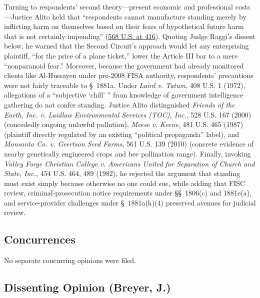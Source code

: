 \documentclass[12pt]{article}
\begin{document}
Turning to respondents' second theory---present economic and professional costs---Justice Alito held that ``respondents cannot manufacture standing merely by inflicting harm on themselves based on their fears of hypothetical future harm that is not certainly impending'' (\href{https://supreme.justia.com/cases/federal/us/568/398/}{568 U.S. at 416}). Quoting Judge Raggi's dissent below, he warned that the Second Circuit's approach would let any enterprising plaintiff, ``for the price of a plane ticket,'' lower the Article III bar to a mere ``nonparanoid fear.'' Moreover, because the government had already monitored clients like Al-Hussayen under pre-2008 FISA authority, respondents' precautions were not fairly traceable to \S~1881a. Under \textit{Laird v. Tatum}, 408 U.S. 1 (1972), allegations of a ``subjective `chill' '' from knowledge of government intelligence gathering do not confer standing. Justice Alito distinguished \textit{Friends of the Earth, Inc. v. Laidlaw Environmental Services (TOC), Inc.}, 528 U.S. 167 (2000) (concededly ongoing unlawful pollution), \textit{Meese v. Keene}, 481 U.S. 465 (1987) (plaintiff directly regulated by an existing ``political propaganda'' label), and \textit{Monsanto Co. v. Geertson Seed Farms}, 561 U.S. 139 (2010) (concrete evidence of nearby genetically engineered crops and bee pollination range). Finally, invoking \textit{Valley Forge Christian College v. Americans United for Separation of Church and State, Inc.}, 454 U.S. 464, 489 (1982), he rejected the argument that standing must exist simply because otherwise no one could sue, while adding that FISC review, criminal-prosecution notice requirements under \S\S~1806(c) and 1881e(a), and service-provider challenges under \S~1881a(h)(4) preserved avenues for judicial review.

\subsection{Concurrences}

No separate concurring opinions were filed.

\subsection{Dissenting Opinion (Breyer, J.)}
\end{document}
